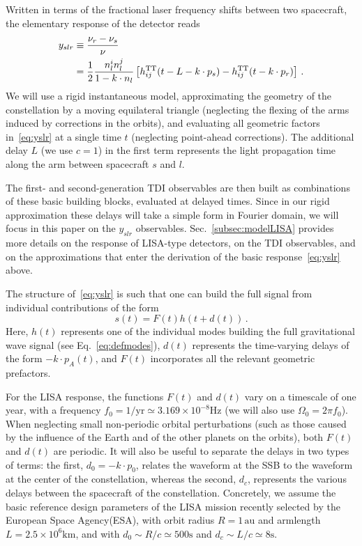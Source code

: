\documentclass[aps,showpacs,twocolumn,
prd,superscriptaddress,nofootinbib]{revtex4-1}
\newcommand{\be}{\begin{equation}}
\newcommand{\ee}{\end{equation}}
\newcommand{\nn}{\nonumber}
\newcommand{\hatk}{k}
\newcommand{\jgb}[1]{{\color{DarkGreen} #1}}
\begin{document}
Written in terms of the fractional laser frequency shifts between two spacecraft, the elementary response of the detector reads~\cite{EW75, RCP04, Vallisneri04}
\begin{align}\label{eq:yslr}
	y_{slr} &\equiv \frac{\nu_{r} - \nu_{s}}{\nu} \nn\\
	&= \frac{1}{2} \frac{n_{l}^{i}n_{l}^{j}}{1 - \hatk\cdot n_{l}} \left[ h_{ij}^{\rm TT}(t - L - \hatk\cdot p_{s}) - h_{ij}^{\rm TT}(t - \hatk\cdot p_{r}) \right] \,.
\end{align}
We will use a rigid instantaneous model, approximating the geometry of the constellation by a moving equilateral triangle (neglecting the flexing of the arms induced by corrections in the orbits), and evaluating all geometric factors in~\eqref{eq:yslr} at a single time $t$ (neglecting point-ahead corrections). The additional delay $L$ (we use $c=1$) in the first term represents the light propagation time along the arm between spacecraft $s$ and $l$.

The first- and second-generation TDI observables are then built as combinations of these basic building blocks, evaluated at delayed times. Since in our rigid approximation these delays will take a simple form in Fourier domain, we will focus in this paper on the $y_{slr}$ observables. Sec.~\ref{subsec:modelLISA} provides more details on the response of LISA-type detectors, on the TDI observables, and on the approximations that enter the derivation of the basic response~\eqref{eq:yslr} above.

The structure of~\eqref{eq:yslr} is such that one can build the full signal from individual contributions of the form
\be
	s(t) = F(t) h(t + d(t)) \,.
\ee
Here, $h(t)$ represents one of the individual modes building the full gravitational wave signal (see Eq.~\eqref{eq:defmodes}), $d(t)$ represents the time-varying delays of the form $-\hatk\cdot p_{A}(t)$, and $F(t)$ incorporates all the relevant geometric prefactors.

For the LISA response, the functions $F(t)$ and $d(t)$ vary on a timescale of one year, with a frequency $f_{0} = 1/\mathrm{yr} \simeq 3.169\times10^{-8} \mathrm{Hz}$ (we will also use $\Omega_{0} = 2\pi f_{0}$). When neglecting small non-periodic orbital perturbations (such as those caused by the influence of the Earth and of the other planets on the orbits), both $F(t)$ and $d(t)$ are periodic. It will also be useful to separate the delays in two types of terms: the first, $d_{0} = -\hatk\cdot p_{0}$, relates the waveform at the SSB to the waveform at the center of the constellation, whereas the second, $d_{c}$, represents the various delays between the spacecraft of the constellation. \jgb{Concretely, we assume the basic reference design parameters of the LISA mission\cite{LISA17} recently selected by the European Space Agency(ESA), with orbit radius $R=1\,\mathrm{au}$ and armlength $L=2.5\times10^{6}\mathrm{km}$, and with $d_{0} \sim R/c \simeq 500\mathrm{s}$ and $d_{c} \sim L/c \simeq 8\mathrm{s}$.}
\end{document}
